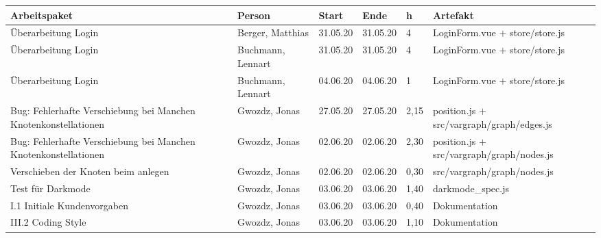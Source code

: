 \begin{longtable}{|p{4cm}|p{2cm}|p{1.2cm}|p{1.2cm}|p{0.7cm}|p{3.8cm}|}
  \hline
  Arbeitspaket                                                          & Person                & Start    & Ende     & h     & Artefakt                                                    \\
  \hline
  Überarbeitung Login                                                   & Berger, Matthias      & 31.05.20 & 31.05.20 & 4     & LoginForm.vue $+$ store/store.js                                              \\ \hline
  

  Überarbeitung Login                                                   & Buchmann, Lennart     & 31.05.20 & 31.05.20 & 4     & LoginForm.vue $+$ store/store.js                                              \\ \hline
  Überarbeitung Login                                                   & Buchmann, Lennart     & 04.06.20 & 04.06.20 & 1     & LoginForm.vue $+$ store/store.js                                             \\ \hline


  Bug: Fehlerhafte Verschiebung bei Manchen Knotenkonstellationen       & Gwozdz, Jonas         & 27.05.20 & 27.05.20 & 2,15   & position.js $+$ src/vargraph/graph/edges.js                                            \\ \hline
  Bug: Fehlerhafte Verschiebung bei Manchen Knotenkonstellationen       & Gwozdz, Jonas         & 02.06.20 & 02.06.20 & 2,30   & position.js $+$ src/vargraph/graph/nodes.js                                      \\ \hline
  Verschieben der Knoten beim anlegen                                   & Gwozdz, Jonas         & 02.06.20 & 02.06.20 & 0,30   & src/vargraph/graph/nodes.js                                                \\ \hline
  Test für Darkmode                                                     & Gwozdz, Jonas         & 03.06.20 & 03.06.20 & 1,40   & darkmode\_spec.js                                               \\ \hline
  I.1 Initiale Kundenvorgaben                                           & Gwozdz, Jonas         & 03.06.20 & 03.06.20 & 0,40   & Dokumentation                                            \\ \hline
  III.2 Coding Style                                                    & Gwozdz, Jonas         & 03.06.20 & 03.06.20 & 1,10   & Dokumentation                                            \\ \hline
  

\end{longtable}
